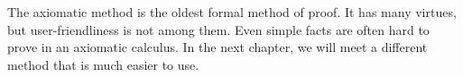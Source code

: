 The axiomatic method is the oldest formal method of proof. It has many virtues,
but user-friendliness is not among them. Even simple facts are often hard to
prove in an axiomatic calculus. In the next chapter, we will meet a different
method that is much easier to use.



  
